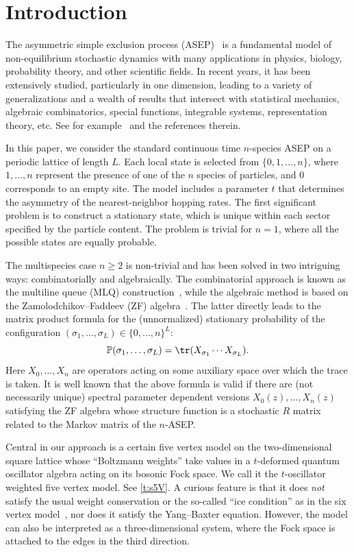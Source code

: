 \section{Introduction}

The asymmetric simple exclusion process (ASEP)~\cite{MGP,Sp} is a fundamental model of non-equi\-lib\-ri\-um stochastic dynamics with many applications in physics, biology, probability theory, and other scientific fields. 
In recent years, it has been extensively studied, particularly in one dimension, leading to a variety of generalizations and a wealth of results that intersect with statistical mechanics, algebraic combinatorics, special functions, integrable systems, 
representation theory, etc.
See for example~\cite{ANP, AKSS, BW, CDW, CMW, CRV, Martin20, PEM} and the references therein.

In this paper, we consider the standard continuous time $n$-species ASEP on a periodic lattice of length $L$. 
Each local state is selected from $\{0,1,\ldots, n\}$, where $1,\ldots, n$ represent the presence of one of the $n$ species of particles, and $0$ corresponds to an empty site. 
The model includes a parameter $t$ that determines the asymmetry of the nearest-neighbor hopping rates. 
The first significant problem is to construct a stationary state, which is unique within each sector specified by the particle content.
The problem is trivial for $n=1$, where all the possible states are equally probable.

The multispecies case $n\ge 2$ is non-trivial and has been solved in two intriguing ways: combinatorially and algebraically. 
The combinatorial approach is known 
as the multiline queue (MLQ) construction~\cite{CMW,Martin20}, 
while the algebraic method is based on the 
Zamolodchikov--Faddeev (ZF) algebra~\cite{CDW,PEM}.
The latter directly leads to the matrix product formula for the (unnormalized) 
stationary probability of the configuration $(\sigma_1,\ldots, \sigma_L) \in \{0,\ldots, n\}^L$:
\[
\mathbb{P}(\sigma_1,\ldots, \sigma_L) = \tr(X_{\sigma_1} \cdots X_{\sigma_L}).
\]
Here $X_0,\ldots, X_n$ are operators acting on some auxiliary space over which the trace is taken.
It is well known that the above formula is valid if there are (not necessarily unique)
spectral parameter dependent versions
$X_0(z), \ldots, X_n(z)$ satisfying the ZF algebra whose structure function 
is a stochastic $R$ matrix related to the Markov matrix of the $n$-ASEP.

Central in our approach is a certain five vertex model 
on the two-dimensional square lattice whose ``Boltzmann weights'' 
take values in a $t$-deformed quantum oscillator algebra acting on its bosonic Fock space. 
We call it the $t$-oscillator weighted five vertex model. See \eqref{t:s5V}. 
A curious feature is that it does {\em not} satisfy the usual weight conservation
or the so-called  ``ice condition'' as in the six vertex model~\cite{Bax}, nor does it satisfy the Yang--Baxter equation.
However, the model can also be interpreted as a three-dimensional system, where the Fock space is attached to the edges in the third direction.

